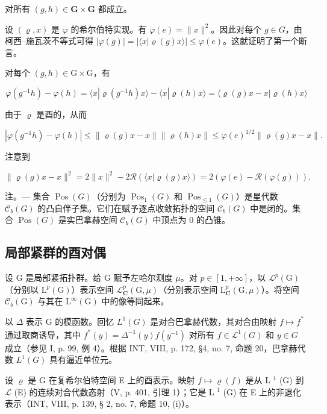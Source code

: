 对所有 \((g,h)\in \mathbf{G}\times \mathbf{G}\) 都成立。

设 \((\varrho, x)\) 是 \(\varphi\) 的希尔伯特实现。有 \(\varphi(e) = \|x\|^2\)。因此对每个 \(g \in G\)，由柯西–施瓦茨不等式可得 \(|\varphi(g)| = |\langle x | \varrho(g)x\rangle| \leqslant \varphi(e)\)。这就证明了第一个断言。

对每个 \((g,h)\in \mathrm{G}\times \mathrm{G}\)，有

\[
\varphi (g ^ {- 1} h) - \varphi (h) = \langle x | \varrho (g ^ {- 1} h) x \rangle - \langle x | \varrho (h) x \rangle = \langle \varrho (g) x - x | \varrho (h) x \rangle
\]

由于 \(\varrho\) 是酉的，从而

\[
| \varphi (g ^ {- 1} h) - \varphi (h) | \leqslant \| \varrho (g) x - x \| \| \varrho (h) x \| \leqslant \varphi (e) ^ {1 / 2} \| \varrho (g) x - x \|.
\]

注意到

\[
\| \varrho (g) x - x \| ^ {2} = 2 \| x \| ^ {2} - 2 \mathcal {R} (\langle x | \varrho (g) x \rangle) = 2 (\varphi (e) - \mathcal {R} (\varphi (g))).
\]

注。--- 集合 \(\operatorname{Pos}(G)\)（分别为 \(\operatorname{Pos}_{1}(G)\) 和 \(\operatorname{Pos}_{\leqslant1}(G)\)）是星代数 \(\mathcal{C}_{b}(G)\) 的凸自伴子集。它们在赋予逐点收敛拓扑的空间 \(\mathcal{C}_{b}(G)\) 中是闭的。集合 \(\operatorname{Pos}(G)\) 是实巴拿赫空间 \(\mathcal{C}_{b}(G)\) 中顶点为 0 的凸锥。

\subsection{局部紧群的酉对偶}

设 G 是局部紧拓扑群。给 G 赋予左哈尔测度 \(\mu\)。对 \(p \in [1, +\infty]\)，以 \(\mathcal{L}^{p}(\mathrm{G})\)（分别以 \(\mathrm{L}^{p}(\mathrm{G})\)）表示空间 \(\mathcal{L}_{\mathbf{C}}^{p}(\mathrm{G}, \mu)\)（分别表示空间 \(\mathrm{L}_{\mathbf{C}}^{p}(\mathrm{G}, \mu)\)）。将空间 \(\mathcal{C}_{b}(\mathrm{G})\) 与其在 \(\mathrm{L}^{\infty}(\mathrm{G})\) 中的像等同起来。

以 \(\Delta\) 表示 G 的模函数。回忆 \(L^1(G)\) 是对合巴拿赫代数，其对合由映射 \(f \mapsto f^*\) 通过取商诱导，其中 \(f^*(y) = \Delta^{-1}(y)\overline{f(y^{-1})}\) 对所有 \(f \in \mathcal{L}^1(G)\) 和 \(y \in G\) 成立（参见 I, p. 99, 例 4）。根据 INT, VIII, p. 172, §4, no. 7, 命题 20，巴拿赫代数 \(L^1(G)\) 具有逼近单位元。

设 \(\varrho\) 是 G 在复希尔伯特空间 E 上的酉表示。映射 \(f\mapsto\varrho(f)\) 是从 L \(^{1}\) (G) 到 \(\mathcal{L}\) (E) 的连续对合代数态射（V, p. 401, 引理 1）；它是 L \(^{1}\) (G) 在 E 上的非退化表示（INT, VIII, p. 139, § 2, no. 7, 命题 10, (i)）。

